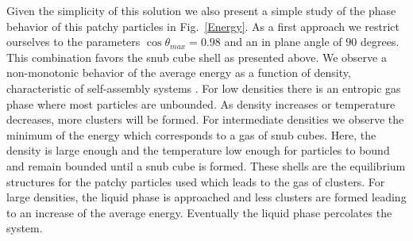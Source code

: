 \documentclass[a4paper, amsfonts, amssymb, amsmath, reprint, showkeys, nofootinbib, twoside]{revtex4-1}
\begin{document}
Given the simplicity of this solution we also present a simple study of the phase behavior of this patchy particles in Fig.~\ref{Energy}. As a first approach we restrict ourselves to the parameters $\cos\theta_{max}=0.98$ and an in plane angle of $90$ degrees. This combination favors the snub cube shell as presented above. We observe a non-monotonic behavior of the average energy as a function of density, characteristic of self-assembly systems \cite{Sciortino2009}. For low densities there is an entropic gas phase where most particles are unbounded. As density increases or temperature decreases, more clusters will be formed. For intermediate densities we observe the minimum of the energy which corresponds to a gas of snub cubes. Here, the density is large enough and the temperature low enough for particles to bound and remain bounded until a snub cube is formed. These shells are the equilibrium structures for the patchy particles used which leads to the gas of clusters. For large densities, the liquid phase is approached and less clusters are formed leading to an increase of the average energy. Eventually the liquid phase percolates the system.
\end{document}
